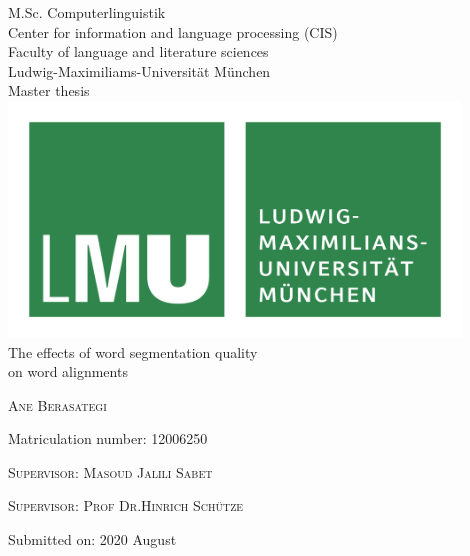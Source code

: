 %
%

\begin{titlepage}
	\begin{center}
		\normalsize
		M.Sc. Computerlinguistik \\
		Center for information and language processing (CIS)  \\
		Faculty of language and literature sciences \\
		Ludwig-Maximiliams-Universität München \\
		\vspace{1cm} %
		\huge
		Master thesis \\
		\vspace{1.5cm}
		\includegraphics[width=12cm]{figures/lmu_logo.png} \\ %
		\vspace{1cm}
		\Huge 
		The effects of word segmentation quality \\
		on word alignments \\
		\vspace{1cm}
		{\Large\scshape Ane Berasategi \par}
		\normalsize
		{Matriculation number: 12006250 \par}
		\vfill
		\vspace{1.5cm}
		{\scshape Supervisor: Masoud Jalili Sabet \par}
		{\scshape Supervisor: Prof Dr.Hinrich Schütze \par}
		{Submitted on: 2020 August \par} %
		\vspace{1cm}
	\end{center}
	\vfill %
\end{titlepage}

